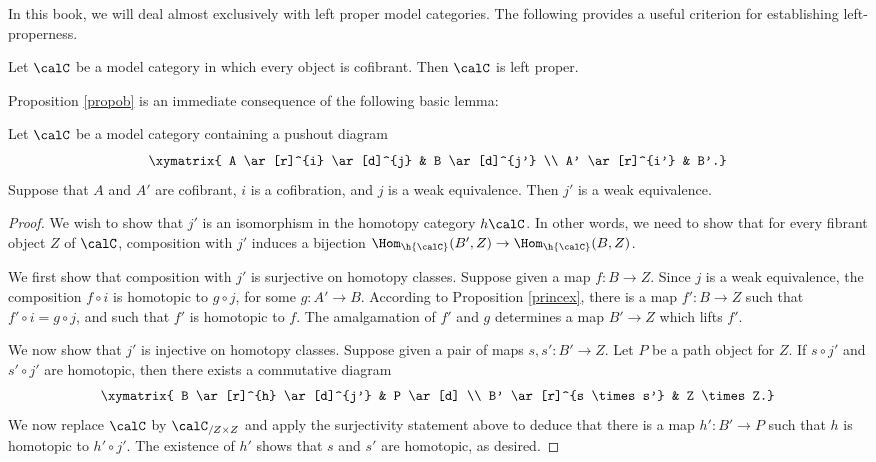 In this book, we will deal almost exclusively with left proper model categories. The following provides a useful criterion for establishing left-properness.

\begin{proposition}\label{propob}
Let $\calC$ be a model category in which every object is cofibrant. Then $\calC$ is left proper.
\end{proposition}

Proposition \ref{propob} is an immediate consequence of the following basic lemma:

\begin{lemma}
Let $\calC$ be a model category containing a pushout diagram
$$ \xymatrix{ A \ar[r]^{i} \ar[d]^{j} & B \ar[d]^{j'} \\
A' \ar[r]^{i'} & B'.}$$
Suppose that $A$ and $A'$ are cofibrant, $i$ is a cofibration, and $j$ is a weak equivalence.
Then $j'$ is a weak equivalence.
\end{lemma}

\begin{proof}
We wish to show that $j'$ is an isomorphism in the homotopy category $h\calC$. In other words, we need to show that for every fibrant object
$Z$ of $\calC$, composition with $j'$ induces a bijection $\Hom_{\h{\calC}}(B',Z) \rightarrow \Hom_{\h{ \calC}}(B,Z)$.

We first show that composition with $j'$ is surjective on homotopy classes. Suppose given
a map $f: B \rightarrow Z$. Since $j$ is a weak equivalence, the composition $f \circ i$ is homotopic to $g \circ j$, for some $g: A' \rightarrow B$. According to Proposition \ref{princex}, there
is a map $f': B \rightarrow Z$ such that $f' \circ i = g \circ j$, and such that $f'$ is homotopic to $f$. The amalgamation of $f'$ and $g$ determines a map $B' \rightarrow Z$ which lifts $f'$.

We now show that $j'$ is injective on homotopy classes. Suppose given a pair of maps
$s,s': B' \rightarrow Z$. Let $P$ be a path object for $Z$. If $s \circ j'$ and $s' \circ j'$ are homotopic, then there exists a commutative diagram
$$ \xymatrix{ B \ar[r]^{h} \ar[d]^{j'} & P \ar[d] \\
B' \ar[r]^{s \times s'} & Z \times Z.}$$
We now replace $\calC$ by $\calC_{/Z \times Z}$ and apply the surjectivity statement above
to deduce that there is a map $h': B' \rightarrow P$ such that $h$ is homotopic to $h' \circ j'$. The existence of $h'$ shows that $s$ and $s'$ are homotopic, as desired.
\end{proof}

